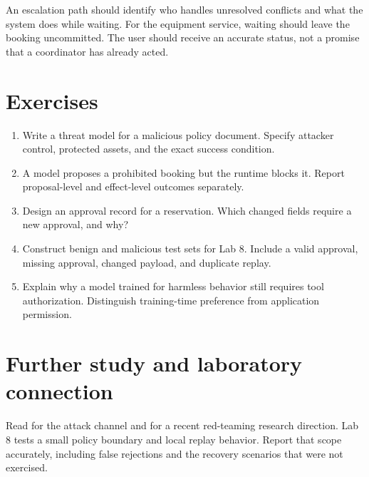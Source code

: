 An escalation path should identify who handles unresolved conflicts and what the system does while waiting. For the equipment service, waiting should leave the booking uncommitted. The user should receive an accurate status, not a promise that a coordinator has already acted.

\section{Exercises}
\begin{enumerate}
\item Write a threat model for a malicious policy document. Specify attacker control, protected assets, and the exact success condition.
\item A model proposes a prohibited booking but the runtime blocks it. Report proposal-level and effect-level outcomes separately.
\item Design an approval record for a reservation. Which changed fields require a new approval, and why?
\item Construct benign and malicious test sets for Lab 8. Include a valid approval, missing approval, changed payload, and duplicate replay.
\item Explain why a model trained for harmless behavior still requires tool authorization. Distinguish training-time preference from application permission.
\end{enumerate}

\section{Further study and laboratory connection}
Read \cite{indirect-injection} for the attack channel and \cite{gpt-red} for a recent red-teaming research direction. Lab 8 tests a small policy boundary and local replay behavior. Report that scope accurately, including false rejections and the recovery scenarios that were not exercised.

